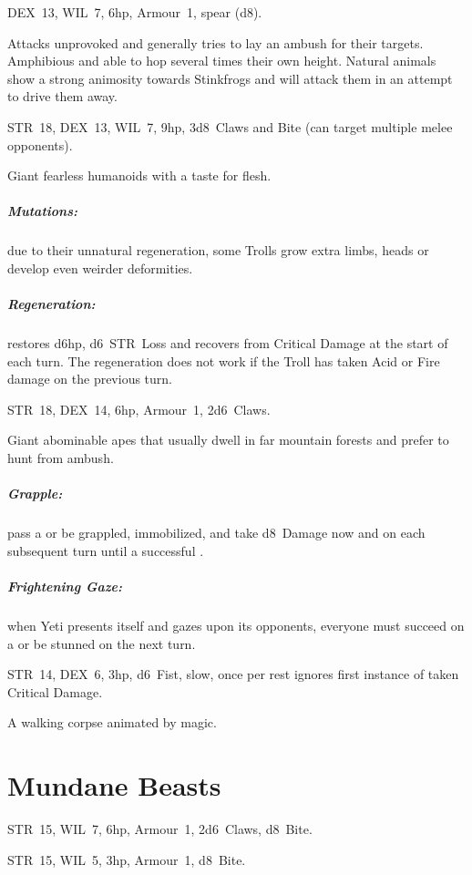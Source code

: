 \documentclass[itdr]{subfiles}
\begin{document}
\vfill

DEX~13, WIL~7, 6hp, Armour~1, spear (d8).

Attacks unprovoked and generally tries to lay an ambush for their targets. Amphibious and able to hop several times their own height. Natural animals show a strong animosity towards Stinkfrogs and will attack them in an attempt to drive them away.

\vfill

STR~18, DEX~13, WIL~7, 9hp, 3d8~Claws and Bite (can target multiple melee opponents).

Giant fearless humanoids with a taste for flesh.

\subparagraph{Mutations:} due to their unnatural regeneration, some Trolls grow extra limbs, heads or develop even weirder deformities.

\subparagraph{Regeneration:} restores d6hp, d6~STR~Loss and recovers from Critical Damage at the start of each turn. The regeneration does not work if the Troll has taken Acid or Fire damage on the previous turn.

\vfill

STR~18, DEX~14, 6hp, Armour~1, 2d6~Claws.

Giant abominable apes that usually dwell in far mountain forests and prefer to hunt from ambush.

\subparagraph{Grapple:} pass a  or be grappled, immobilized, and take d8~Damage now and on each subsequent turn until a successful .

\subparagraph{Frightening Gaze:} when Yeti presents itself and gazes upon its opponents, everyone must succeed on a  or be stunned on the next turn.

\vfill

STR~14, DEX~6, 3hp, d6~Fist, slow, once per rest \mbox{ignores} first instance of taken Critical Damage.

A walking corpse animated by magic.


\vfill
\break

\section{Mundane Beasts}

STR~15, WIL~7, 6hp, Armour~1, 2d6~Claws, d8~Bite.

\vfill

STR~15, WIL~5, 3hp, Armour~1, d8~Bite.
\end{document}
